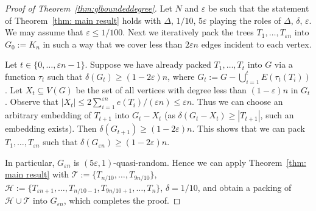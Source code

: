 \documentclass[a4paper, 11pt, reqno]{amsart}
\numberwithin{equation}{section}
\newcommand{\1}{{\rm 1\hspace*{-0.4ex}%
\rule{0.1ex}{1.52ex}\hspace*{0.2ex}}}
\newcommand{\cT}{\mathcal{T}}
\newcommand{\cH}{\mathcal{H}}
\renewcommand{\epsilon}{\varepsilon}
\newcommand{\sub}{\subseteq}
\begin{document}
\begin{proof}[Proof of Theorem~\ref{thm:glboundeddegree}]
Let $N$ and $\epsilon$ be 
such that the statement of Theorem~\ref{thm: main result} holds with 
$\Delta$, $1/10$, $5\epsilon$ playing the roles of $\Delta$, $\delta$, $\epsilon$.
We may assume that $\epsilon\leq 1/100$.
Next we iteratively pack the trees $T_1,\ldots,T_{\epsilon n}$ into $G_0:=K_n$
in such a way that we cover less than $2\epsilon n$ edges incident to each vertex.



Let $t\in \{0,\ldots, \epsilon n-1\}$.
Suppose we have already packed $T_1,\ldots,T_t$ into $G$ via a function $\tau_t$
such that $\delta(G_t)\geq (1-2\epsilon)n$, where
$G_t:=G-\bigcup_{i=1}^{t}E(\tau_t(T_i))$.
Let $X_t\sub V(G)$ be the set of all vertices with degree less than $(1-\epsilon)n$ in $G_t$.
Observe that $|X_t|\leq 2\sum_{i=1}^{\epsilon n}e(T_i)/(\epsilon n)\leq \epsilon n$.
Thus we can choose an arbitrary embedding of $T_{t+1}$ into $G_t- X_t$ (as $\delta(G_t- X_t)\geq |T_{t+1}|$, such an embedding exists).
Then $\delta(G_{t+1})\geq (1-2\epsilon)n$. This shows that we can pack $T_1,\dots, T_{\epsilon n}$ such that $\delta(G_{\epsilon n}) \geq  (1-2\epsilon )n$.

In particular, $G_{\epsilon n}$ is $(5\epsilon,1)$-quasi-random.
Hence we can apply Theorem~\ref{thm: main result} 
with $\cT:=\{T_{n/10},\ldots,T_{9n/10}\}$, $\cH:=\{T_{\epsilon n+1}, \dots, T_{n/10-1}, T_{9n/10+1},\dots, T_{n}\}$, $\delta=1/10$,
and obtain a packing of $\cH\cup \cT$ into $G_{\epsilon n}$, which completes the proof.
\end{proof}



%
\end{document}
